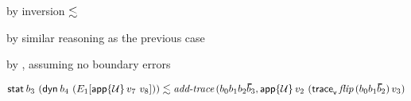 {\begin{lamportproof*}
    \begin{pfproof}
        \begin{pfproof}
          by inversion $\lesssim$
        \end{pfproof}
        \begin{pfproof}
          by similar reasoning as the previous case
        \end{pfproof}
        \begin{pfproof}
          by \pfih, assuming no boundary errors
        \end{pfproof}
      \qedstep
        \begin{pfproof}\(
          \rexpr{\estab{\sbnd_3}{(\edynb{\sbnd_4}{(\ctx_1[\eapp{\tdyn}{\svalue_7}{\svalue_8}])})}}{\faddtrace{\fconcat{\sbnd_0}{\fconcat{\sbnd_1}{\fconcat{\sbnd_2}{\sblist_3}}}}{\eapp{\tdyn}{\svalue_2}{(\ehist{\fflip{\fconcat{\sbnd_0}{\fconcat{\sbnd_1}{\sblist_2}}}}{\svalue_3}}}}
        \)\end{pfproof}
    \end{pfproof}

\end{lamportproof*}}

